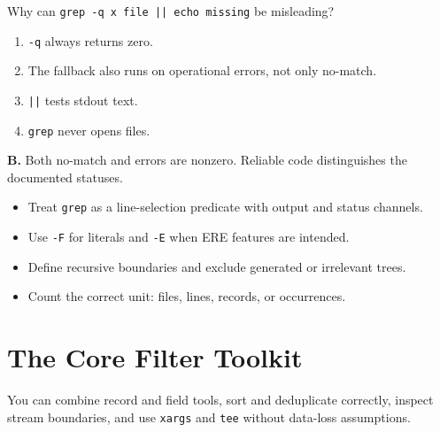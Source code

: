 \documentclass[11pt,oneside,openany]{book}
\newcommand{\fourchoices}[4]{%
  \begin{enumerate}[label=\Alph*),leftmargin=2em,itemsep=0.25em]
    \item #1
    \item #2
    \item #3
    \item #4
  \end{enumerate}}
\newcommand{\chaptergoals}[1]{%
  \begin{tcolorbox}[colback=Paper,colframe=Blue,title={Learning outcomes},fonttitle=\bfseries]
  #1
  \end{tcolorbox}}
\begin{document}
\begin{questionbox}[title={Hard 10.2 -- Error handling}]
Why can \texttt{grep -q x file || echo missing} be misleading?
\fourchoices{\texttt{-q} always returns zero.}{The fallback also runs on operational errors, not only no-match.}{\texttt{||} tests stdout text.}{\texttt{grep} never opens files.}
\end{questionbox}
\begin{answerbox}
\textbf{B.} Both no-match and errors are nonzero. Reliable code distinguishes the documented statuses.
\end{answerbox}

\begin{recapbox}
\begin{itemize}
  \item Treat \texttt{grep} as a line-selection predicate with output and status channels.
  \item Use \texttt{-F} for literals and \texttt{-E} when ERE features are intended.
  \item Define recursive boundaries and exclude generated or irrelevant trees.
  \item Count the correct unit: files, lines, records, or occurrences.
\end{itemize}
\end{recapbox}

\chapter{The Core Filter Toolkit}
\chaptergoals{You can combine record and field tools, sort and deduplicate correctly, inspect stream boundaries, and use \texttt{xargs} and \texttt{tee} without data-loss assumptions.}
\end{document}
